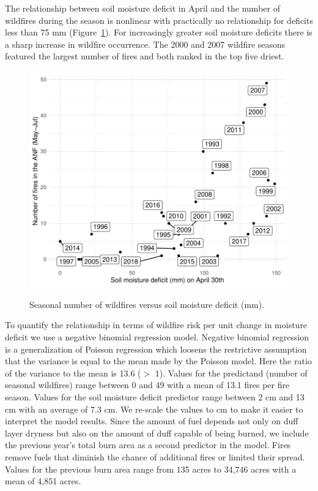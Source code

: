 \documentclass[12pt]{iopart}
\begin{document}
The relationship between soil moisture deficit in April and the number of wildfires during the season is nonlinear with practically no relationship for deficits less than 75 mm (Figure~\ref{Scatterplot}). For increasingly greater soil moisture deficits there is a sharp increase in wildfire occurrence. The 2000 and 2007 wildfire seasons featured the largest number of fires and both ranked in the top five driest.
\begin{figure}[t]
\noindent\includegraphics[scale=.8,trim=0in 0in 0in 0in,clip]{Scatterplot.pdf}\\
\vspace{0in}
\caption{Seasonal number of wildfires versus soil moisture deficit (mm).}
\label{Scatterplot}
\end{figure}

To quantify the relationship in terms of wildfire risk per unit change in moisture deficit we use a negative binomial regression model. Negative binomial regression is a generalization of Poisson regression which loosens the restrictive assumption that the variance is equal to the mean made by the Poisson model. Here the ratio of the variance to the mean is 13.6 ($>$ 1). Values for the predictand (number of seasonal wildfires) range between 0 and 49 with a mean of 13.1 fires per fire season. Values for the soil moisture deficit predictor range between 2 cm and 13 cm with an average of 7.3 cm. We re-scale the values to cm to make it easier to interpret the model results.  Since the amount of fuel depends not only on duff layer dryness but also on the amount of duff capable of being burned, we include the previous year's total burn area as a second predictor in the model. Fires remove fuels that diminish the chance of additional fires or limited their spread. Values for the previous burn area range from 135 acres to 34,746 acres with a mean of 4,851 acres.
\end{document}
